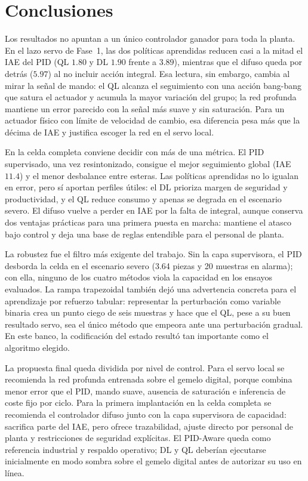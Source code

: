 \chapter{Conclusiones}
\label{ch:conclusiones}

Los resultados no apuntan a un único controlador ganador para toda la planta. En el lazo servo de Fase~1, las dos políticas aprendidas reducen casi a la mitad el IAE del PID (QL $1.80$ y DL $1.90$ frente a $3.89$), mientras que el difuso queda por detrás ($5.97$) al no incluir acción integral. Esa lectura, sin embargo, cambia al mirar la señal de mando: el QL alcanza el seguimiento con una acción bang-bang que satura el actuador y acumula la mayor variación del grupo; la red profunda mantiene un error parecido con la señal más suave y sin saturación. Para un actuador físico con límite de velocidad de cambio, esa diferencia pesa más que la décima de IAE y justifica escoger la red en el servo local.

En la celda completa conviene decidir con más de una métrica. El PID supervisado, una vez resintonizado, consigue el mejor seguimiento global (IAE $11.4$) y el menor desbalance entre esteras. Las políticas aprendidas no lo igualan en error, pero sí aportan perfiles útiles: el DL prioriza margen de seguridad y productividad, y el QL reduce consumo y apenas se degrada en el escenario severo. El difuso vuelve a perder en IAE por la falta de integral, aunque conserva dos ventajas prácticas para una primera puesta en marcha: mantiene el atasco bajo control y deja una base de reglas entendible para el personal de planta.

La robustez fue el filtro más exigente del trabajo. Sin la capa supervisora, el PID desborda la celda en el escenario severo (3.64 piezas y 20 muestras en alarma); con ella, ninguno de los cuatro métodos viola la capacidad en los ensayos evaluados. La rampa trapezoidal también dejó una advertencia concreta para el aprendizaje por refuerzo tabular: representar la perturbación como variable binaria crea un punto ciego de seis muestras y hace que el QL, pese a su buen resultado servo, sea el único método que empeora ante una perturbación gradual. En este banco, la codificación del estado resultó tan importante como el algoritmo elegido.

La propuesta final queda dividida por nivel de control. Para el servo local se recomienda la red profunda entrenada sobre el gemelo digital, porque combina menor error que el PID, mando suave, ausencia de saturación e inferencia de coste fijo por ciclo. Para la primera implantación en la celda completa se recomienda el controlador difuso junto con la capa supervisora de capacidad: sacrifica parte del IAE, pero ofrece trazabilidad, ajuste directo por personal de planta y restricciones de seguridad explícitas. El PID-Aware queda como referencia industrial y respaldo operativo; DL y QL deberían ejecutarse inicialmente en modo sombra sobre el gemelo digital antes de autorizar su uso en línea.

